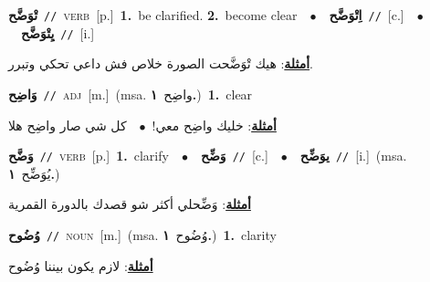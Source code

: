 \documentclass[10pt,a4paper,twoside]{article} %
\begin{document}
\begin{multicols}{2}
{\setlength\topsep{0pt}\textbf{\foreignlanguage{arabic}{تْوَضَّح}}\ {\color{gray}\texttt{//}\color{black}}\ \textsc{verb}\ [p.]\ \textbf{1.}~be clarified.  \textbf{2.}~become clear\ \ $\bullet$\ \ \setlength\topsep{0pt}\textbf{\foreignlanguage{arabic}{اِتْوَضَّح}}\ {\color{gray}\texttt{//}\color{black}}\ [c.]\ \ $\bullet$\ \ \setlength\topsep{0pt}\textbf{\foreignlanguage{arabic}{يِتْوَضَّح}}\ {\color{gray}\texttt{//}\color{black}}\ [i.]\  \begin{flushright}\color{gray}\foreignlanguage{arabic}{\textbf{\underline{\foreignlanguage{arabic}{أمثلة}}}: هيك تْوَضَّحت الصورة خلاص فش داعي تحكي وتبرر.}\end{flushright}\color{black}} \vspace{2mm}

{\setlength\topsep{0pt}\textbf{\foreignlanguage{arabic}{وَاضِح}}\ {\color{gray}\texttt{//}\color{black}}\ \textsc{adj}\ [m.]\ \color{gray}(msa. \foreignlanguage{arabic}{واضِح}~\foreignlanguage{arabic}{\textbf{١.}})\color{black}\ \textbf{1.}~clear\  \begin{flushright}\color{gray}\foreignlanguage{arabic}{\textbf{\underline{\foreignlanguage{arabic}{أمثلة}}}: خليك واضِح معي!\ $\bullet$\ \  كل شي صار واضِح هلا}\end{flushright}\color{black}} \vspace{2mm}

{\setlength\topsep{0pt}\textbf{\foreignlanguage{arabic}{وَضَّح}}\ {\color{gray}\texttt{//}\color{black}}\ \textsc{verb}\ [p.]\ \textbf{1.}~clarify\ \ $\bullet$\ \ \setlength\topsep{0pt}\textbf{\foreignlanguage{arabic}{وَضِّح}}\ {\color{gray}\texttt{//}\color{black}}\ [c.]\ \ $\bullet$\ \ \setlength\topsep{0pt}\textbf{\foreignlanguage{arabic}{يوَضِّح}}\ {\color{gray}\texttt{//}\color{black}}\ [i.]\ \color{gray}(msa. \foreignlanguage{arabic}{يُوَضِّح}~\foreignlanguage{arabic}{\textbf{١.}})\color{black}\  \begin{flushright}\color{gray}\foreignlanguage{arabic}{\textbf{\underline{\foreignlanguage{arabic}{أمثلة}}}: وَضِّحلي أكثر شو قصدك بالدورة القمرية}\end{flushright}\color{black}} \vspace{2mm}

{\setlength\topsep{0pt}\textbf{\foreignlanguage{arabic}{وُضُوح}}\ {\color{gray}\texttt{//}\color{black}}\ \textsc{noun}\ [m.]\ \color{gray}(msa. \foreignlanguage{arabic}{وُضُوح}~\foreignlanguage{arabic}{\textbf{١.}})\color{black}\ \textbf{1.}~clarity\  \begin{flushright}\color{gray}\foreignlanguage{arabic}{\textbf{\underline{\foreignlanguage{arabic}{أمثلة}}}: لازم يكون بيننا وُضُوح}\end{flushright}\color{black}} \vspace{2mm}


\end{multicols}
\end{document}

